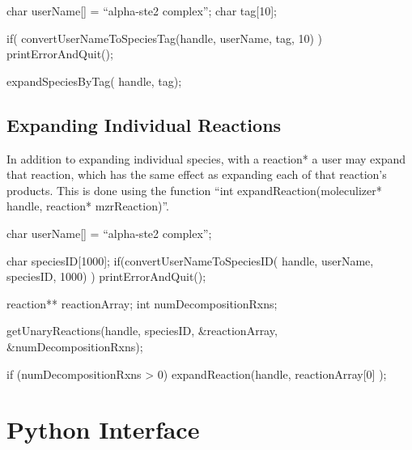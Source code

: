 \begin{ExampleC}

char userName[] = ``alpha-ste2 complex'';
char tag[10];

if( convertUserNameToSpeciesTag(handle, userName, tag, 10) ) printErrorAndQuit();

expandSpeciesByTag( handle, tag);

\end{ExampleC}

\subsection{Expanding Individual Reactions}
In addition to expanding individual species, with a reaction* a user
may expand that reaction, which has the same effect as expanding each
of that reaction's products.  This is done using the function ``int
expandReaction(moleculizer* handle, reaction* mzrReaction)''. 

\begin{ExampleC}
  char userName[] = ``alpha-ste2 complex'';

  char speciesID[1000];
  if(convertUserNameToSpeciesID( handle, userName, speciesID, 1000) ) 
  { 
    printErrorAndQuit();
  }

  reaction** reactionArray;
  int numDecompositionRxns;

  getUnaryReactions(handle, speciesID, &reactionArray, &numDecompositionRxns);

  if (numDecompositionRxns > 0)
  {
    expandReaction(handle, reactionArray[0] );
  }
  

\end{ExampleC}

\section{Python Interface}







